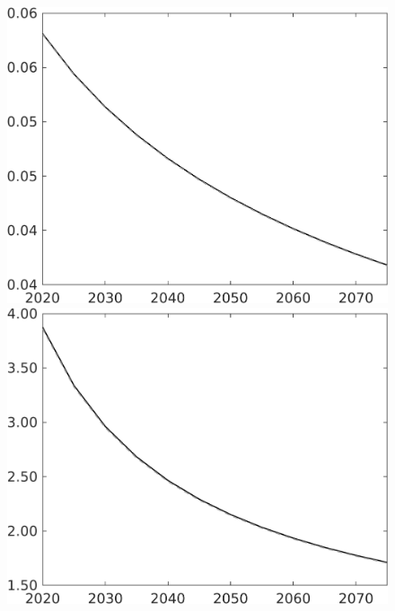 \documentclass[12pt]{article}
\begin{document}
\begin{figure}[h!!]
\begin{minipage}[]{0.32\textwidth}
	\end{minipage}		
	\begin{minipage}[]{0.32\textwidth}
		\includegraphics[width=1\textwidth]{../../codding_model/own_basedOnFried/optimalPol_010922_revision/figures/all_13Sept22/CompTaul_Equlab_LFBAU_Reg0_pepn_spillover0_nsk0_xgr1_knspil0_sep1_countec0_GovRev0_etaa0.79_lgd0.png}
	\end{minipage}	
	\begin{minipage}[]{0.32\textwidth}
		\includegraphics[width=1\textwidth]{../../codding_model/own_basedOnFried/optimalPol_010922_revision/figures/all_13Sept22/CompTaul_Equlab_LFBAU_Reg0_pgpftf_spillover0_nsk0_xgr1_knspil0_sep1_countec0_GovRev0_etaa0.79_lgd0.png}

\end{minipage}
\end{figure}
\end{document}
